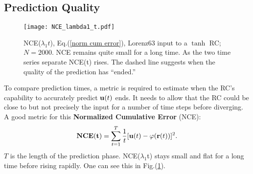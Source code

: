 \documentclass[12pt]{article}
\begin{document}
\subsection{Prediction Quality} 
\label{sec: pred quality}
\begin{figure}[htpb!]
    \centering
    \texttt{[image: NCE\_lambda1\_t.pdf]}
    \caption{NCE($\lambda_1 t$), Eq.(\ref{norm cum error}), Lorenz63 input to a $\tanh$ RC; $N = 2000$.  NCE remains quite small for a long time. As the two time series separate NCE(t) rises. The dashed line suggests when the quality of the prediction has ``ended.''}
    \label{fig: error}
\end{figure}
To compare prediction times, a metric is required to estimate when the RC's capability to accurately predict $\mbox{$\bf{u}$}(t)$ ends. It needs to allow that the RC could be close to but not precisely the input for a number of time steps before diverging. A good metric for this {\bf Normalized Cumulative Error} (NCE):
\begin{equation}
    {\bf NCE(t)} = \sum_{t = 1}^T \frac{1}{t}[\mbox{$\bf{u}$}(t) - \varphi(\mbox{{\bf r}}(t))]^2.
     \label{norm cum error}
\end{equation}
$T$ is the length of the prediction phase. NCE($\lambda_1$t) stays small and flat for a long time before rising rapidly. 
One can see this in Fig.(\ref{fig: error}).

\newpage

%
%
%
%
%


\end{document}
